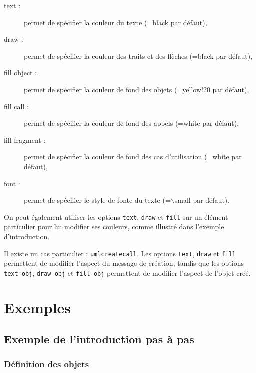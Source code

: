 \documentclass[a4paper,11pt]{report}
\newcommand{\inputTikZ}[1]{%
  }%
\newcommand{\inputTikZ}[1]{%
    \texttt{[image: fig/\#1.pdf]}%
  }%
\begin{document}
\begin{description}
\item[text :] permet de spécifier la couleur du texte (=black par défaut),
\item[draw :] permet de spécifier la couleur des traits et des flèches (=black par défaut),
\item[fill object :] permet de spécifier la couleur de fond des objets (=yellow!20 par défaut),
\item[fill call :] permet de spécifier la couleur de fond des appels (=white par défaut),
\item[fill fragment :] permet de spécifier la couleur de fond des cas d'utilisation (=white par défaut),
\item[font :] permet de spécifier le style de fonte du texte (=$\backslash$small par défaut).
\end{description}

On peut également utiliser les options {\tt text}, {\tt draw} et {\tt fill} sur un élément particulier pour lui modifier ses couleurs, comme illustré dans l'exemple d'introduction. 

Il existe un cas particulier : {\tt umlcreatecall}. Les options {\tt text}, {\tt draw} et {\tt fill} permettent de modifier l'aspect du message de création, tandis que les options {\tt text obj}, {\tt draw obj} et {\tt fill obj} permettent de modifier l'aspect de l'objet créé.

\medskip

\begin{minipage}{0.6\textwidth}

\end{minipage}
\begin{minipage}{0.4\textwidth}
\begin{center}
\inputTikZ{figure80}
\end{center}
\end{minipage}

\section{Exemples}

\subsection{Exemple de l'introduction pas à pas}

\subsubsection{Définition des objets}
\end{document}
